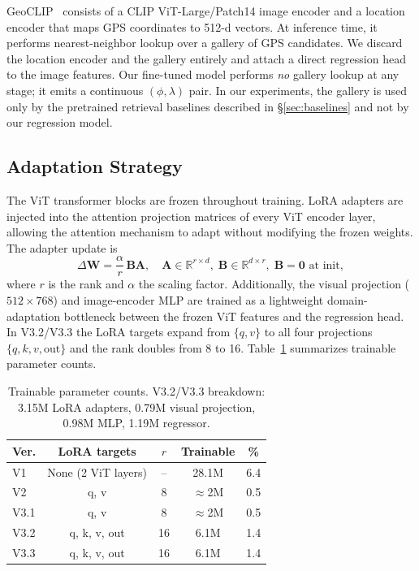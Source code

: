 \documentclass[10pt,twocolumn,letterpaper]{article}
\begin{document}
GeoCLIP~\cite{geoclip} consists of a CLIP ViT-Large/Patch14 image encoder
and a location encoder that maps GPS coordinates to 512-d vectors.
At inference time, it performs nearest-neighbor lookup over a gallery of GPS
candidates.
We discard the location encoder and the gallery entirely and attach a direct
regression head to the image features. Our fine-tuned model performs
\emph{no} gallery lookup at any stage; it emits a continuous $(\phi,\lambda)$
pair. In our experiments, the gallery is used only by the pretrained retrieval
baselines described in \S\ref{sec:baselines} and not by our regression model.

\subsection{Adaptation Strategy}

The ViT transformer blocks are frozen throughout training.
LoRA adapters are injected into the attention projection matrices of every
ViT encoder layer, allowing the attention mechanism to adapt without modifying
the frozen weights. The adapter update is
\begin{equation}
\Delta\mathbf{W} = \frac{\alpha}{r}\,\mathbf{B}\mathbf{A},\quad
\mathbf{A}\in\mathbb{R}^{r\times d},\;
\mathbf{B}\in\mathbb{R}^{d\times r},\;
\mathbf{B}=\mathbf{0}\text{ at init},
\label{eq:lora}
\end{equation}
where $r$ is the rank and $\alpha$ the scaling factor.
Additionally, the visual projection ($512\times768$) and image-encoder MLP are
trained as a lightweight domain-adaptation bottleneck between the frozen ViT
features and the regression head.
In V3.2/V3.3 the LoRA targets expand from $\{q,v\}$ to all four projections
$\{q,k,v,\mathrm{out}\}$ and the rank doubles from 8 to 16.
Table~\ref{tab:params} summarizes trainable parameter counts.

\begin{table}[t]
\centering\small
\begin{tabular}{@{}lcccc@{}}
\toprule
Ver. & LoRA targets & $r$ & Trainable & \% \\
\midrule
V1   & None (2 ViT layers) & --  & 28.1M & 6.4 \\
V2   & q, v          &  8  & $\approx$2M  & 0.5 \\
V3.1 & q, v          &  8  & $\approx$2M  & 0.5 \\
V3.2 & q, k, v, out  & 16  & 6.1M  & 1.4 \\
V3.3 & q, k, v, out  & 16  & 6.1M  & 1.4 \\
\bottomrule
\end{tabular}
\smallskip
\caption{Trainable parameter counts. V3.2/V3.3 breakdown: 3.15M LoRA adapters,
0.79M visual projection, 0.98M MLP, 1.19M regressor.}
\label{tab:params}
\end{table}
\end{document}

